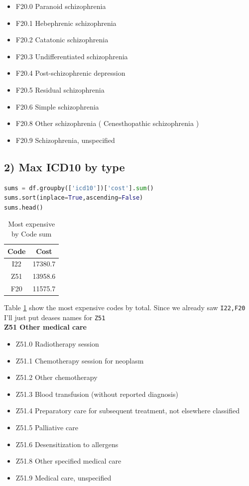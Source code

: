 \documentclass[10pt]{article}
\begin{document}
\begin{table}[H]
\begin{enumerate}
\begin{itemize}
\item F20.0 Paranoid schizophrenia
\item F20.1 Hebephrenic schizophrenia
\item F20.2 Catatonic schizophrenia
\item F20.3 Undifferentiated schizophrenia
\item F20.4 Post-schizophrenic depression
\item F20.5 Residual schizophrenia
\item F20.6 Simple schizophrenia
\item F20.8 Other schizophrenia  ( Cenesthopathic schizophrenia )
\item  F20.9 Schizophrenia, unspecified
\end{itemize}
\end{enumerate}
\end{table}

\subsection*{2) Max ICD10 by type}
\begin{lstlisting}[language=python]
sums = df.groupby(['icd10'])['cost'].sum()
sums.sort(inplace=True,ascending=False)
sums.head()
\end{lstlisting}
\begin{table}[H]
\center
\begin{tabular}{|c|c|}
\hline
\textbf{Code}&\textbf{Cost}\\
\hline
I22   & 17380.7\\
\hline
Z51   & 13958.6\\
\hline
F20   & 11575.7\\
\hline
\end{tabular}
\caption{Most expensive by Code sum\label{table:4}}
\end{table}
Table \ref{table:4} show the most expensive codes by total. Since we already saw \texttt{I22,F20} I'll just put deases names for \texttt{Z51}\\
\textbf{Z51 Other medical care}
\begin{itemize}
\item Z51.0 Radiotherapy session
\item Z51.1 Chemotherapy session for neoplasm
\item Z51.2 Other chemotherapy
\item Z51.3 Blood transfusion (without reported diagnosis)
\item Z51.4 Preparatory care for subsequent treatment, not elsewhere classified
\item Z51.5 Palliative care
\item Z51.6 Desensitization to allergens
\item Z51.8 Other specified medical care
\item Z51.9 Medical care, unspecified
\end{itemize}
\end{document}

